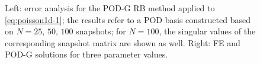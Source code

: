 \documentclass[12pt, a4paper, twoside, openright, notitlepage]{report}
\numberwithin{equation}{chapter}
\theoremstyle{theorem}
\theoremstyle{definition}
\theoremstyle{remark}
\theoremstyle{proposition}
\numberwithin{figure}{chapter}
\begin{document}
\begin{figure}[H]
			
			\caption{Left: error analysis for the POD-G RB method applied to \eqref{eq:poisson1d-1}; the results refer to a POD basis constructed based on $N = 25$, $50$, $100$ snapshots; for $N = 100$, the singular values of the corresponding snapshot matrix are shown as well. Right: FE and POD-G solutions for three parameter values.}
			\label{fig:poisson1d-1-fig1}
		\end{figure}
						
\end{document}

